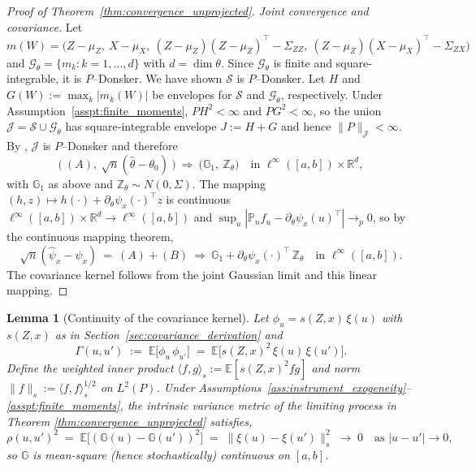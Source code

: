 \documentclass[12pt]{article}
\newcommand{\E}{\mathbb{E}}
\newcommand{\R}{\mathbb{R}} %
\newtheorem{lemma}{Lemma}
\begin{document}
\begin{proof}[Proof of Theorem~\ref{thm:convergence_unprojected}]
\textit{Joint convergence and covariance.}
Let
\[
m(W) = \big(Z-\mu_Z,\ X-\mu_X,\ (Z-\mu_Z)(Z-\mu_Z)^\top - \Sigma_{ZZ},\ (Z-\mu_Z)(X-\mu_X)^\top - \Sigma_{ZX}\big)
\]
and $\mathcal{G}_\theta=\{m_k:k=1,\dots,d\}$ with $d=\dim\theta$.
Since $\mathcal{G}_\theta$ is finite and square-integrable, it is $P$--Donsker.
We have shown $\mathcal{S}$ is $P$--Donsker. Let $H$ and $G(W):=\max_k |m_k(W)|$ be envelopes for $\mathcal{S}$
and $\mathcal{G}_\theta$, respectively. Under Assumption~\ref{asspt:finite_moments}, $PH^2<\infty$ and $PG^2<\infty$,
so the union $\mathcal{J}=\mathcal{S}\cup\mathcal{G}_\theta$ has square-integrable envelope $J:=H+G$
and hence $\|P\|_{\mathcal{J}}<\infty$.
By \citet[Example~2.10.7]{vaart1996weak}, $\mathcal{J}$ is $P$--Donsker and therefore
\[
\Big(\ (A),\ \sqrt{n}(\hat\theta-\theta_0)\ \Big)\ \Rightarrow\ \big(\mathbb{G}_1,\ \mathbb{Z}_\theta\big)
\quad\text{in } \ell^\infty([a,b])\times\R^d,
\]
with $\mathbb{G}_1$ as above and $\mathbb{Z}_\theta\sim N(0,\Sigma)$.
The mapping $(h,z)\mapsto h(\cdot)+\partial_\theta\psi_x(\cdot)^\top z$
is continuous $\ell^\infty([a,b])\times\R^d\to\ell^\infty([a,b])$ and
$\sup_u|\mathbb{P}_n f_u-\partial_\theta\psi_x(u)^\top|\to_p0$,
so by the continuous mapping theorem,
\[
\sqrt{n}(\hat\psi_x-\psi_x)\ =\ (A)+(B)\ \Rightarrow\
\mathbb{G}_1+\partial_\theta\psi_x(\cdot)^\top\,\mathbb{Z}_\theta
\quad\text{in } \ell^\infty([a,b]).
\]
The covariance kernel follows from the joint Gaussian limit and this linear mapping.
\end{proof}

 \begin{lemma}[Continuity of the covariance kernel] \label{lem:Gamma-cont-strong}
Let $\phi_u = s(Z,x)\,\xi(u)$ with $s(Z,x)$ as in Section~\ref{sec:covariance_derivation} and
\[
\Gamma(u,u') \;:=\; \E\!\big[\phi_u\,\phi_{u'}\big] \;=\; \E\!\big[s(Z,x)^2\,\xi(u)\,\xi(u')\big].
\]
Define the weighted inner product $\langle f,g\rangle_s:=\E[s(Z,x)^2 f g]$ and norm
$\|f\|_{s}:=\langle f,f\rangle_s^{1/2}$ on $L^2(P)$.
Under Assumptions~\ref{ass:instrument_exogeneity}--\ref{asspt:finite_moments}, the intrinsic variance metric of the limiting process in Theorem \ref{thm:convergence_unprojected} satisfies,
\[
\rho(u,u')^2 \;=\; \E\!\big[(\mathbb{G}(u)-\mathbb{G}(u'))^2\big]
\;=\;\|\xi(u)-\xi(u')\|_{s}^2 \;\longrightarrow\; 0
\quad\text{as }|u-u'|\to0,
\]
so $\mathbb{G}$ is mean-square (hence stochastically) continuous on $[a,b]$.
\end{lemma}
\end{document}
